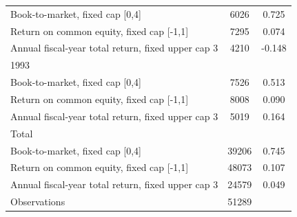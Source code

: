 {\begin{tabular}{l*{1}{cc}}
Book-to-market, fixed cap [0,4]&        6026&       0.725\\
Return on common equity, fixed cap [-1,1]&        7295&       0.074\\
Annual fiscal-year total return, fixed upper cap 3&        4210&      -0.148\\
\hline
1993                &            &            \\
Book-to-market, fixed cap [0,4]&        7526&       0.513\\
Return on common equity, fixed cap [-1,1]&        8008&       0.090\\
Annual fiscal-year total return, fixed upper cap 3&        5019&       0.164\\
\hline
Total               &            &            \\
Book-to-market, fixed cap [0,4]&       39206&       0.745\\
Return on common equity, fixed cap [-1,1]&       48073&       0.107\\
Annual fiscal-year total return, fixed upper cap 3&       24579&       0.049\\
\hline
Observations        &       51289&            \\
\hline\hline
\end{tabular}
}
